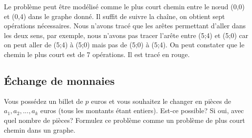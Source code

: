 \begin{solution}
Le problème peut être modélisé comme le plus court chemin entre le nœud (0,0) et (0,4) dans le graphe donné. Il suffit de suivre la chaîne, on obtient sept opérations nécessaires. Nous n'avons tracé que les arêtes permettant d'aller dans les deux sens, par exemple, nous n'avons pas tracer  l'arête entre (5;4) et (5;0) car on peut aller de (5;4) à (5;0) mais pas de (5;0) à (5;4). On peut constater que le chemin le plus court est de 7 opérations. Il est tracé en rouge.
\begin{center}
\end{center}
\end{solution}

\subsection{Échange de monnaies}
	Vous possédez un billet de $p$ euros et vous souhaitez le changer en pièces de $a_1, a_2, ..., a_k$ euros (tous les montants étant entiers). Est-ce possible? Si oui, avec quel nombre de pièces? Formulez ce problème comme un problème de plus court chemin dans un graphe.


